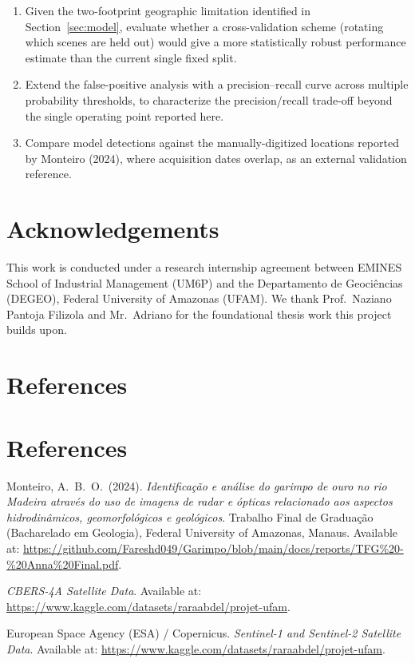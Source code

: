 \documentclass[11pt,a4paper]{article}
\begin{document}
\begin{enumerate}[nosep]
        train Dice 0.87 vs.\ validation Dice 0.52), through stronger
        regularization, more aggressive augmentation, or additional labeled
        data.
  \item Given the two-footprint geographic limitation identified in
        Section~\ref{sec:model}, evaluate whether a cross-validation scheme
        (rotating which scenes are held out) would give a more statistically
        robust performance estimate than the current single fixed split.
  \item Extend the false-positive analysis with a precision--recall curve
        across multiple probability thresholds, to characterize the
        precision/recall trade-off beyond the single operating point
        reported here.
  \item Compare model detections against the manually-digitized locations
        reported by Monteiro (2024), where acquisition dates overlap, as an
        external validation reference.
\end{enumerate}

\section*{Acknowledgements}
This work is conducted under a research internship agreement between EMINES
School of Industrial Management (UM6P) and the Departamento de
Geoci\^encias (DEGEO), Federal University of Amazonas (UFAM). We thank
Prof.\ Naziano Pantoja Filizola and Mr.\ Adriano 
for the foundational thesis work this project builds upon.

\section*{References}
\section*{References}
\begin{footnotesize}

\noindent
Monteiro, A.\ B.\ O.\ (2024).
\textit{Identifica\c{c}\~ao e an\'alise do garimpo de ouro no rio Madeira
atrav\'es do uso de imagens de radar e \'opticas relacionado aos aspectos
hidrodin\^amicos, geomorfol\'ogicos e geol\'ogicos}.
Trabalho Final de Gradua\c{c}\~ao (Bacharelado em Geologia),
Federal University of Amazonas, Manaus.
Available at:
\url{https://github.com/Fareshd049/Garimpo/blob/main/docs/reports/TFG%20-%20Anna%20Final.pdf}.

\noindent
\textit{CBERS-4A Satellite Data}.
Available at:
\url{https://www.kaggle.com/datasets/raraabdel/projet-ufam}.

\noindent
European Space Agency (ESA) / Copernicus.
\textit{Sentinel-1 and Sentinel-2 Satellite Data}.
Available at:
\url{https://www.kaggle.com/datasets/raraabdel/projet-ufam}.

\end{footnotesize}
\end{document}
